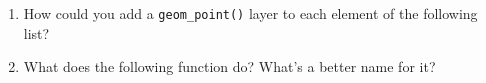 \begin{enumerate}
\def\labelenumi{\arabic{enumi}.}
\item
  How could you add a \texttt{geom\_point()} layer to each element of
  the following list?

\begin{Shaded}
\begin{Highlighting}[]
\StringTok{ }\NormalTok{(}
   
\NormalTok{)}
\end{Highlighting}
\end{Shaded}
\item
  What does the following function do? What's a better name for it?

\begin{Shaded}
\begin{Highlighting}[]
\StringTok{ }
  \NormalTok{(}\DataTypeTok{+}\NormalTok{, } \NormalTok{)}
\NormalTok{\}}

\NormalTok{(}
  \StringTok{ }\NormalTok{(), }
  \NormalTok{(), }
  \NormalTok{(}\NormalTok{), }
  \NormalTok{(}\NormalTok{)}
\NormalTok{)}
\end{Highlighting}
\end{Shaded}
\end{enumerate}

\hypertarget{refs}{}
